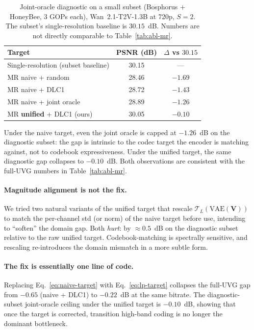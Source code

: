 \begin{table}[t]
\centering
\caption{Joint-oracle diagnostic on a small subset
(Bosphorus + HoneyBee, $3$ GOPs each), Wan~2.1-T2V-1.3B at 720p,
$S\!=\!2$. The subset's single-resolution baseline is $30.15$~dB.
Numbers are not directly comparable to Table~\ref{tab:abl-mr}.}
\label{tab:abl-oracle}
\small
\begin{tabular}{@{}l c c@{}}
\toprule
Target & PSNR (dB) & $\Delta$ vs $30.15$ \\
\midrule
Single-resolution (subset baseline) & 30.15 & --- \\
MR naive + random        & 28.46 & $-1.69$ \\
MR naive + DLC1          & 28.72 & $-1.43$ \\
MR naive + joint oracle  & 28.89 & $-1.26$ \\[2pt]
\rowcolor{wacvblue!10}
MR \textbf{unified} + DLC1 (ours) & 30.05 & $-0.10$ \\
\bottomrule
\end{tabular}
\end{table}

Under the naive target, even the joint oracle is capped at $-1.26$~dB on
the diagnostic subset: the gap is intrinsic to the codec target the
encoder is matching against, not to codebook expressiveness. Under the
unified target, the same diagnostic gap collapses to $-0.10$~dB. Both
observations are consistent with the full-UVG numbers in
Table~\ref{tab:abl-mr}.

\paragraph{Magnitude alignment is not the fix.}
We tried two natural variants of the unified target that rescale
$\mathcal{T}_L(\mathrm{VAE}(\mathbf{V}))$ to match the per-channel std
(or norm) of the naive target before use, intending to ``soften'' the
domain gap. Both \emph{hurt}: by $\approx 0.5$~dB on the diagnostic
subset relative to the raw unified target. Codebook-matching is
spectrally sensitive, and rescaling re-introduces the domain mismatch
in a more subtle form.

\paragraph{The fix is essentially one line of code.}
Replacing Eq.~\ref{eq:naive-target} with Eq.~\ref{eq:lp-target} collapses
the full-UVG gap from $-0.65$ (naive + DLC1) to $-0.22$~dB at the same
bitrate. The diagnostic-subset joint-oracle ceiling under the unified
target is $-0.10$~dB, showing that once the target is corrected, transition
high-band coding is no longer the dominant bottleneck.

